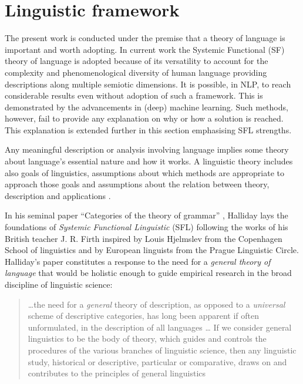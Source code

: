 \section{Linguistic framework}
\label{sec:framework}
The present work is conducted under the premise that a theory of language is important and worth adopting. In current work the Systemic Functional (SF) theory of language is adopted because of its versatility to account for the complexity and phenomenological diversity of human language providing descriptions along multiple semiotic dimensions. It is possible, in NLP, to reach considerable results even without adoption of such a framework. This is demonstrated by the advancements in (deep) machine learning. Such methods, however, fail to provide any explanation on why or how a solution is reached. This explanation is extended further in this section emphasising SFL strengths.
 
Any meaningful description or analysis involving language implies some theory about language's essential nature and how it works. A linguistic theory includes also goals of linguistics, assumptions about which methods are appropriate to approach those goals and assumptions about the relation between theory, description and applications \citep[3]{Fawcett2000}. 

In his seminal paper ``Categories of the theory of grammar'' \citep{Halliday61}, Halliday lays the foundations of \textit{Systemic Functional Linguistic} (SFL) following the works of his British teacher J. R. Firth inspired by Louis Hjelmslev \citep{Hjelmslev53} from the Copenhagen School of linguistics and by European linguists from the Prague Linguistic Circle. Halliday's paper constitutes a response to the need for a \textit{general theory of language} that would be holistic enough to guide empirical research in the broad discipline of linguistic science:
\begin{quotation}
    \dots the need for a \textit{general} theory of description, as opposed to a \textit{universal} scheme of descriptive categories, has long been apparent if often unformulated, in the description of all languages \citep[54; emphasis in original]{Halliday57}
    \dots
    If we consider general linguistics to be the body of theory, which guides and controls the procedures of the various branches of linguistic science, then any linguistic study, historical or descriptive, particular or comparative, draws on and contributes to the principles of general linguistics \citep[55]{Halliday57}
\end{quotation} 

